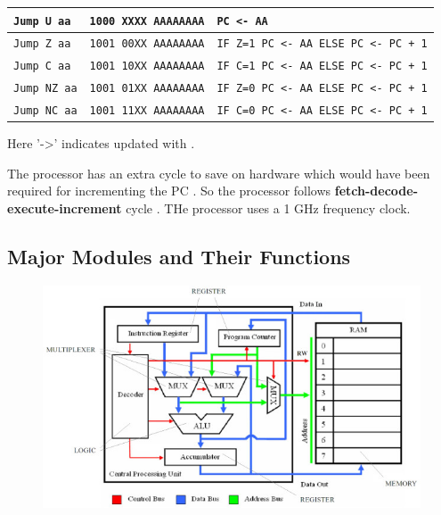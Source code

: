 \documentclass[11pt]{article}
\begin{document}
\begin{longtable}{|l|l|l|}
              \texttt{Jump U aa} &  \texttt{1000 XXXX AAAAAAAA} & \texttt{PC <- AA} \\ \hline
              
              \texttt{Jump Z aa} &  \texttt{1001 00XX AAAAAAAA} & \texttt{IF Z=1 PC <- AA ELSE PC <- PC + 1} \\ \hline
              
              \texttt{Jump C aa} &  \texttt{1001 10XX AAAAAAAA} & \texttt{IF C=1 PC <- AA ELSE PC <- PC + 1} \\ \hline
              
              \texttt{Jump NZ aa} &  \texttt{1001 01XX AAAAAAAA} & \texttt{IF Z=0 PC <- AA ELSE PC <- PC + 1} \\ \hline
              
              \texttt{Jump NC aa} &  \texttt{1001 11XX AAAAAAAA} & \texttt{IF C=0 PC <- AA ELSE PC <- PC + 1}\\ \hline
              
\end{longtable}


Here '->' indicates updated with .

The processor has an extra cycle to save on hardware which would have been required for incrementing the PC . So the processor follows \textbf{fetch-decode-execute-increment} cycle .
THe processor uses a 1 GHz frequency clock.


\subsection{Major Modules and Their Functions}
\begin{figure}[H]
  \begin{center}
    \caption{}
    \includegraphics[scale=0.5]{top_view.jpg}
  \end{center}
\end{figure}
\end{document}

